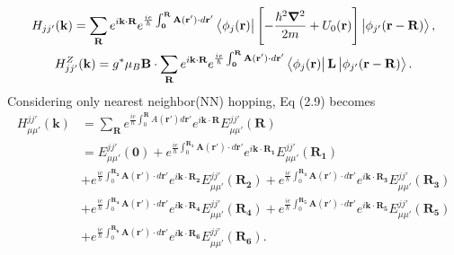 \documentclass{report}
\newcommand{\f}[2]{\dfrac{#1}{#2}}
\begin{document}
\begin{gather}
	H_{jj'}(\mathbf{k})
	= \sum_{\mathbf{R}} e^{i \mathbf{k \cdot R}} e^{\frac{ie}{\hbar} \int_{\mathbf{0}}^{\mathbf{R}} \mathbf{A(\mathbf{r'})} \cdot d \mathbf{r'} } \bra{\phi_{j}(\mathbf{r})} \left[ -\f{\hbar^{2} \boldsymbol{\nabla}^{2}}{2m} + U_{0} (\mathbf{r}) \right] \ket{\phi_{j'}(\mathbf{r - R})},\\
	H_{jj'}^{Z}(\mathbf{k})
	= g^{*} \mu_{B} \mathbf{B} \cdot \sum_{\mathbf{R}} e^{i\mathbf{k\cdot R}} e^{\frac{ie}{\hbar} \int_{\mathbf{0}}^{\mathbf{R}} \mathbf{A(\mathbf{r'})} \cdot d\mathbf{r'} } \bra{\phi_{j}(\mathbf{r})} \mathbf{L} \ket{\phi_{j'}(\mathbf{r - R})}.
\end{gather}
Considering only nearest neighbor(NN) hopping, Eq (2.9) becomes
\begin{equation}
	\begin{aligned}
		H_{\mu\mu'}^{jj'}(\mathbf{k})
		 & = \sum_{\mathbf{R}} e^{\frac{ie}{\hbar}\int_{0}^{\mathbf{R}}A(\mathbf{r'})d\mathbf{r'}}e^{i\mathbf{k\cdot R}} E_{\mu\mu'}^{jj'}(\mathbf{R})                                                                                                                                                   \\
		 & = E_{\mu\mu'}^{jj'}(\mathbf{0}) + e^{\frac{ie}{\hbar}\int_{0}^{\mathbf{R_1}}\mathbf{A(\mathbf{r'})}\cdot d\mathbf{r'}}e^{i\mathbf{k\cdot R_1}} E_{\mu\mu'}^{jj'}(\mathbf{R_1})                                                                                                                \\
		 & + e^{\frac{ie}{\hbar}\int_{0}^{\mathbf{R_2}}\mathbf{A(\mathbf{r'})}\cdot d\mathbf{r'}}e^{i\mathbf{k\cdot R_2}} E_{\mu\mu'}^{jj'}(\mathbf{R_2}) + e^{\frac{ie}{\hbar}\int_{0}^{\mathbf{R_3}}\mathbf{A(\mathbf{r'})}\cdot d\mathbf{r'}}e^{i\mathbf{k\cdot R_3}} E_{\mu\mu'}^{jj'}(\mathbf{R_3}) \\
		 & + e^{\frac{ie}{\hbar}\int_{0}^{\mathbf{R_4}}\mathbf{A(\mathbf{r'})}\cdot d\mathbf{r'}}e^{i\mathbf{k\cdot R_4}} E_{\mu\mu'}^{jj'}(\mathbf{R_4}) + e^{\frac{ie}{\hbar}\int_{0}^{\mathbf{R_5}}\mathbf{A(\mathbf{r'})}\cdot d\mathbf{r'}}e^{i\mathbf{k\cdot R_5}} E_{\mu\mu'}^{jj'}(\mathbf{R_5}) \\
		 & + e^{\frac{ie}{\hbar}\int_{0}^{\mathbf{R_6}}\mathbf{A(\mathbf{r'})}\cdot d\mathbf{r'}}e^{i\mathbf{k\cdot R_6}} E_{\mu\mu'}^{jj'}(\mathbf{R_6}).
	\end{aligned}
\end{equation}
\end{document}
